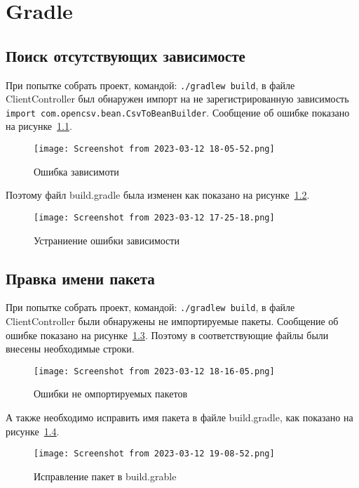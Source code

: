 \chapter{Gradle}
\section{Поиск отсутствующих зависимосте}
При попытке собрать проект, командой: \texttt{./gradlew~build},
в файле ClientController был обнаружен импорт на не зарегистрированную
зависимость \texttt{import~com.opencsv.bean.CsvToBeanBuilder}.
Сообщение об ошибке показано на рисунке~\ref{fig:gradle:dep:undisc:error}.

\begin{figure}[h!tp]
	\centering
	\texttt{[image: Screenshot from 2023-03-12 18-05-52.png]}
	\caption{Ошибка зависимоти}
	\label{fig:gradle:dep:undisc:error}
\end{figure}

Поэтому файл build.gradle была изменен как показано
на рисунке~\ref{fig:gradle:dep:undisc:good}.

\begin{figure}[h!tp]
	\centering
	\texttt{[image: Screenshot from 2023-03-12 17-25-18.png]}
	\caption{Устраниение ошибки зависимости}
	\label{fig:gradle:dep:undisc:good}
\end{figure}

\section{Правка имени пакета}
При попытке собрать проект, командой: \texttt{./gradlew~build},
в файле ClientController были обнаружены не импортируемые пакеты.
Сообщение об ошибке показано на рисунке~\ref{fig:gradle:imp:error}.
Поэтому в соответствующие файлы были внесены необходимые строки.

\begin{figure}[h!tp]
	\centering
	\texttt{[image: Screenshot from 2023-03-12 18-16-05.png]}
	\caption{Ошибки не омпортируемых пакетов}
	\label{fig:gradle:imp:error}
\end{figure}

А также необходимо исправить имя пакета в файле build.gradle, как показано
на рисунке~\ref{fig:gradle:build:pack}.

\begin{figure}[h!tp]
	\centering
	\texttt{[image: Screenshot from 2023-03-12 19-08-52.png]}
	\caption{Исправление пакет в build.grable}
	\label{fig:gradle:build:pack}
\end{figure}
